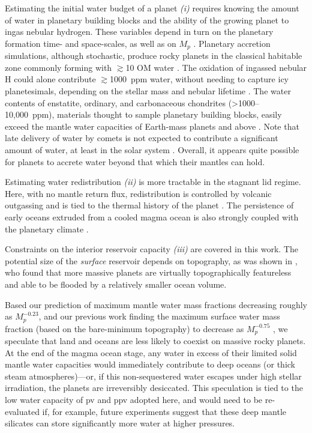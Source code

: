 Estimating the initial water budget of a planet \textit{(i)} requires knowing the amount of water in planetary building blocks and the ability of the growing planet to ingas nebular hydrogen. These variables depend in turn on the planetary formation time- and space-scales, as well as on $M_p$ \citep[and references therein]{sharp_nebular_2017, unterborn_inward_2018, kimura_formation_2020, ohtani_hydration_2021}. Planetary accretion simulations, although stochastic, produce rocky planets in the classical habitable zone commonly forming with $\gtrsim$10 OM water \citep{raymond_making_2004, raymond_highresolution_2006, zain_planetary_2018}. The oxidation of ingassed nebular H could alone contribute $\gtrsim$1000~ppm water, without needing to capture icy planetesimals, depending on the stellar mass and nebular lifetime \citep{olson_nebular_2019, kimura_predicted_2022}. The water contents of enstatite, ordinary, and carbonaceous chondrites (\textgreater 1000--10,000~ppm), materials thought to sample planetary building blocks, easily exceed the mantle water capacities of Earth-mass planets and above \citep{abe_water_2000}. Note that late delivery of water by comets is not expected to contribute a significant amount of water, at least in the solar system \citep{morbidelli_source_2000}. Overall, it appears quite possible for planets to accrete water beyond that which their mantles can hold.



Estimating water redistribution \textit{(ii)} is more tractable in the stagnant lid regime. Here, with no mantle return flux, redistribution is controlled by volcanic outgassing and is tied to the thermal history of the planet \citep[e.g.,][]{ortenzi_mantle_2020}. The persistence of early oceans extruded from a cooled magma ocean is also strongly coupled with the planetary climate \citep[e.g.,][]{elkins-tanton_formation_2011, miyazaki_wet_2022}. 

Constraints on the interior reservoir capacity \textit{(iii)} are covered in this work. The potential size of the \textit{surface} reservoir depends on topography, as was shown in \citet{guimond_blue_2022}, who found that more massive planets are virtually topographically featureless and able to be flooded by a relatively smaller ocean volume.

Based our prediction of maximum mantle water mass fractions decreasing roughly as $M_p^{-0.23}$, and our previous work finding the maximum surface water mass fraction (based on the bare-minimum topography) to decrease as $M_p^{-0.75}$ \citep{guimond_blue_2022}, we speculate that land and oceans are less likely to coexist on massive rocky planets. At the end of the magma ocean stage, any water in excess of their limited solid mantle water capacities would immediately contribute to deep oceans (or thick steam atmospheres)---or, if this non-sequestered water escapes under high stellar irradiation, the planets are irreversibly desiccated. This speculation is tied to the low water capacity of pv and ppv adopted here, and would need to be re-evaluated if, for example, future experiments suggest that these deep mantle silicates can store significantly more water at higher pressures.

